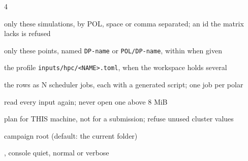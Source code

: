 \begin{multicols}{4}
\begin{flags}
\item {} only these simulations, by POL, space or comma separated; an id the matrix lacks is refused
\item {} only these points, named \texttt{DP-name} or \texttt{POL/DP-name}, within  when given
\item {} the profile \texttt{inputs/hpc/<NAME>.toml}, when the workspace holds several
\item {} the rows as N scheduler jobs, each with a generated script;  one job per polar
\item {} read every input again;  never open one above 8 MiB
\item {} plan for THIS machine, not for a submission;  refuse unused cluster values
\item {} campaign root (default: the current folder)
\item {},  console quiet, normal or verbose
\end{flags}


\end{multicols}
